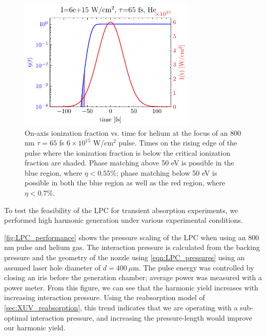 \begin{figure}
	\centering
	\includegraphics[width=0.75\textwidth]{figures/chap3/eta_vs_t_He800_6e15Wcm2.pdf}
	\caption{On-axis ionization fraction vs. time for helium at the focus of an 800 nm $\tau = 65$ fs $6 \times 10^{15}$ W/cm$^2$ pulse. Times on the rising edge of the pulse where the ionization fraction is below the critical ionization fraction are shaded. Phase matching above 50 eV is possible in the blue region, where $\eta < 0.55\%$; phase matching below 50 eV is possible in both the blue region as well as the red region, where $\eta < 0.7\%$.}
	\label{fig:eta_vs_t_He800_6e15Wcm2}
\end{figure}

To test the feasibility of the LPC for transient absorption experiments, we performed high harmonic generation under various experimental conditions.

\cref{fig:LPC_performance} shows the pressure scaling of the LPC when using an 800 nm pulse and helium gas. The interaction pressure is calculated from the backing pressure and the geometry of the nozzle using \cref{eqn:LPC_pressures} using an assumed laser hole diameter of $d = 400 \ \mu$m. The pulse energy was controlled by closing an iris before the generation chamber; average power was measured with a power meter. From this figure, we can see that the harmonic yield increases with increasing interaction pressure. Using the reabsorption model of \cref{sec:XUV_reabsorption}, this trend indicates that we are operating with a sub-optimal interaction pressure, and increasing the pressure-length would improve our harmonic yield.

